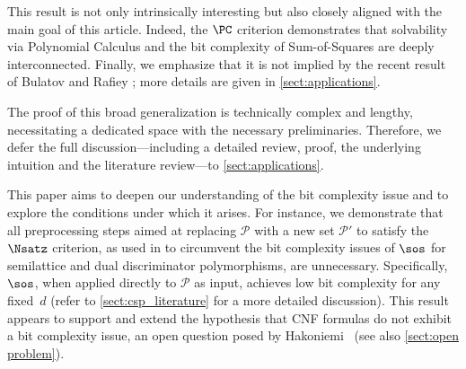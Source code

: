 \documentclass[11pt]{article}
\begin{document}
    {This result is not only intrinsically interesting but also closely aligned with the main goal of this article. Indeed, the $\PC$ criterion demonstrates that solvability via Polynomial Calculus and the bit complexity of Sum-of-Squares are deeply interconnected.
    }
    Finally, we emphasize that it is not implied by the recent result of Bulatov and Rafiey \cite{BulatovRSTOC22}; more details are given in \cref{sect:applications}.

The proof of this broad generalization is technically complex and lengthy, necessitating a dedicated space with the necessary preliminaries. Therefore, we defer the full discussion—including a detailed review, proof, the underlying intuition and the literature review—to \cref{sect:applications}.


    


This paper aims to deepen our understanding of the bit complexity issue and to explore the conditions under which it arises. For instance, we demonstrate that all preprocessing steps aimed at replacing \(\mathcal{P}\) with a new set \(\mathcal{P'}\) to satisfy the \(\Nsatz\) criterion, as used in \cite{BulatovRSTOC22,Mastrolilli21TALG, BharathiM22, BharathiM21} to circumvent the bit complexity issues of \(\sos\) for semilattice and dual discriminator polymorphisms, are unnecessary. Specifically, \(\sos\), when applied directly to \(\mathcal{P}\) as input, achieves low bit complexity for any fixed~\(d\) (refer to \cref{sect:csp_literature} for a more detailed discussion). This result appears to support and extend the hypothesis that CNF formulas do not exhibit a bit complexity issue, an open question posed by Hakoniemi~\cite{Hakoniemi21} (see also \cref{sect:open problem}).
\end{document}
